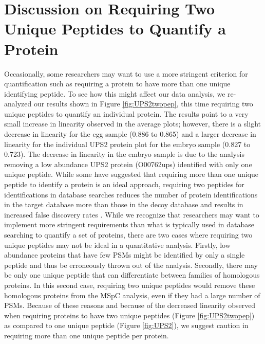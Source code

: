 \section {Discussion on Requiring Two Unique Peptides to Quantify a Protein}
\label{sec:discussiontwopep}
Occasionally, some researchers may want to use a more stringent criterion for quantification such as requiring a protein to have more than one unique identifying peptide. To see how this might affect our data analysis, we re-analyzed our results shown in Figure \ref{fig:UPS2twopep}, this time requiring two unique peptides to quantify an individual protein. The results point to a very small increase in linearity observed in the average plots; however, there is a slight decrease in linearity for the egg sample (0.886 to 0.865) and a larger decrease in linearity for the individual UPS2 protein plot for the embryo sample (0.827 to 0.723). The decrease in linearity in the embryo sample is due to the analysis removing a low abundance UPS2 protein (O00762ups) identified with only one unique peptide. While some have suggested that requiring more than one unique peptide to identify a protein is an ideal approach, requiring two peptides for identifications in database searches reduces the number of protein identifications in the target database more than those in the decoy database and results in increased false discovery rates \citep{gupta09}. While we recognize that researchers may want to implement more stringent requirements than what is typically used in database searching to quantify a set of proteins, there are two cases where requiring two unique peptides may not be ideal in a quantitative analysis. Firstly, low abundance proteins that have few PSMs might be identified by only a single peptide and thus be erroneously thrown out of the analysis. Secondly, there may be only one unique peptide that can differentiate between families of homologous proteins. In this second case, requiring two unique peptides would remove these homologous proteins from the MSpC analysis, even if they had a large number of PSMs. Because of these reasons and because of the decreased linearity observed when requiring proteins to have two unique peptides (Figure \ref{fig:UPS2twopep}) as compared to one unique peptide (Figure \ref{fig:UPS2}), we suggest caution in requiring more than one unique peptide per protein.


